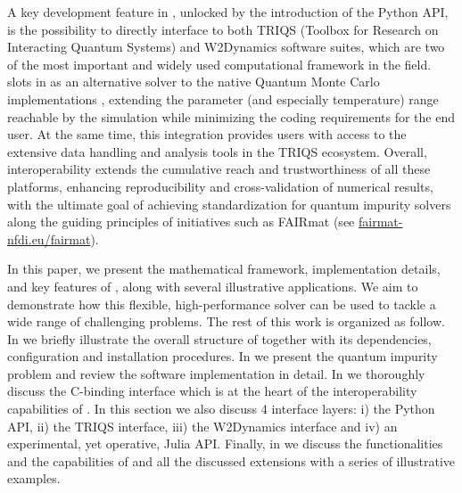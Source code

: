 \documentclass[edipack_sp.tex]{subfiles}
\begin{document}
A key development feature in \NAME, unlocked by the introduction of the Python API, 
is the possibility to directly interface to both TRIQS \cite{Parcollet2015CPC} (Toolbox for Research on Interacting Quantum Systems) and
W2Dynamics \cite{Wallerberger2019CPC} software suites, which are two of the most important and widely used computational framework in the field.
\NAME slots in as an alternative solver to the native Quantum Monte Carlo 
implementations \cite{Gull2011RMP,Seth2016CPC}, extending the parameter (and especially temperature) range reachable by 
the simulation while minimizing the coding requirements for the end user.
At the same time, this integration provides \NAME users with access to the
extensive data handling and analysis tools in the TRIQS ecosystem. 
Overall, interoperability extends the cumulative reach and trustworthiness of all these platforms,
enhancing reproducibility and cross-validation of numerical results, with the ultimate goal of achieving standardization for quantum impurity solvers along the guiding principles of initiatives such as FAIRmat (see \href{https://www.fairmat-nfdi.eu/fairmat/}{fairmat-nfdi.eu/fairmat}). 


In this paper, we present the mathematical framework, implementation
details, and key features of \NAME, along with several illustrative
applications. We aim to demonstrate how this flexible,
high-performance solver can be used to tackle a wide range of
challenging problems. 
The rest of this work is organized as follow. In  we 
briefly illustrate the overall structure of \NAME together with its dependencies, configuration
and installation procedures. In  we present the quantum impurity
problem and review the software implementation in detail. In  we thoroughly discuss the C-binding interface which is at the heart of the 
interoperability capabilities of \NAME. In this section we also discuss 4 interface layers: i) 
the Python API, ii) the TRIQS interface, iii) the W2Dynamics interface and iv) an experimental, yet operative, Julia API.
Finally, in  we discuss the functionalities and the capabilities of \NAME and  all the discussed extensions with a series of illustrative examples. 

\ifSubfilesClassLoaded{
  
}{}
\end{document}
